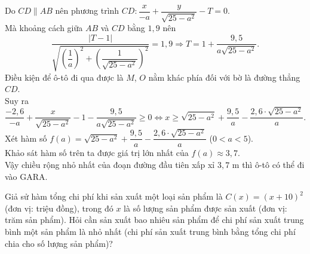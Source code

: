 \begin{bt}
{Do $CD \parallel AB$ nên phương trình $CD\colon \dfrac{x}{-a}+\dfrac{y}{\sqrt{25-a^2}}-T=0$.\\
Mà khoảng cách giữa $AB$ và $CD$ bằng $1{,}9$ nên
$$
\dfrac{|T-1|}{\sqrt{\left(\dfrac{1}{a}\right)^2+\left(\dfrac{1}{\sqrt{25-a^2}}\right)^2}}=1,9 \Rightarrow T=1+\dfrac{9,5}{a \sqrt{25-a^2}} .
$$
Điều kiện để ô-tô đi qua được là $M$, $O$ nằm khác phía đối với bờ là đường thẳng $CD$.\\
Suy ra
$$
\dfrac{-2,6}{-a}+\dfrac{x}{\sqrt{25-a^2}}-1-\dfrac{9,5}{a \sqrt{25-a^2}} \geq 0 \Leftrightarrow x \geq \sqrt{25-a^2}+\dfrac{9,5}{a}-\dfrac{2,6 \cdot \sqrt{25-a^2}}{a}.
$$
Xét hàm số $f(a)=\sqrt{25-a^2}+\dfrac{9,5}{a}-\dfrac{2,6 \cdot \sqrt{25-a^2}}{a}$ ($0<a<5$).\\
Khảo sát hàm số trên ta được giá trị lớn nhất của $f(a) \approx 3{,}7$.\\
Vậy chiều rộng nhỏ nhất của đoạn đường đầu tiên xấp xỉ $3{,}7$ m thì ô-tô có thể đi vào GARA.
	}
\end{bt}

\begin{bt}%
Giả sử hàm tổng chi phí khi sản xuất một loại sản phẩm là $C(x)=(x+10)^2$ (đơn vị: triệu đồng), trong đó $x$ là số lượng sản phẩm được sản xuất (đơn vị: trăm sản phẩm). Hỏi cần sản xuất bao nhiêu sản phẩm để chi phí sản xuất trung bình một sản phẩm là nhỏ nhất (chi phí sản xuất trung bình bằng tổng chi phí chia cho số lượng sản phẩm)?\\
\end{bt}

